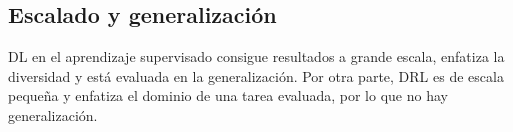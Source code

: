 \subsection{Escalado y generalización}%
\label{sub:escalado_y_generalización}

DL en el aprendizaje supervisado consigue resultados a grande escala, enfatiza la
diversidad y está evaluada en la generalización. Por otra parte, DRL es de escala pequeña y
enfatiza el dominio de una tarea evaluada, por lo que no hay generalización.
